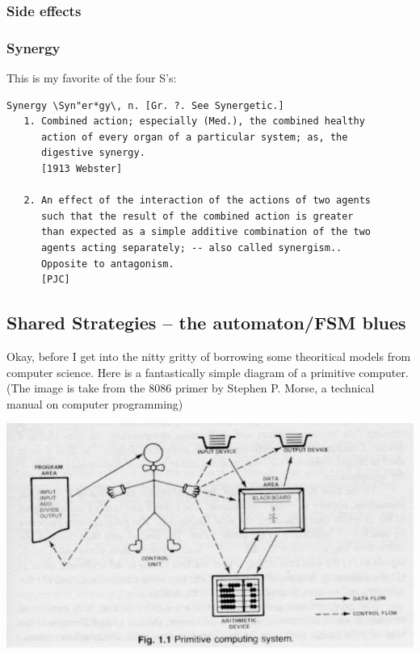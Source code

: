 \documentclass[11pt]{article}
\begin{document}
\subsubsection{Side effects}
\label{sec:orge5cecc2}


\subsubsection{Synergy}
\label{sec:org12de085}
This is my favorite of the four S's:

\begin{verbatim}
Synergy \Syn"er*gy\, n. [Gr. ?. See Synergetic.]
   1. Combined action; especially (Med.), the combined healthy
      action of every organ of a particular system; as, the
      digestive synergy.
      [1913 Webster]

   2. An effect of the interaction of the actions of two agents
      such that the result of the combined action is greater
      than expected as a simple additive combination of the two
      agents acting separately; -- also called synergism..
      Opposite to antagonism.
      [PJC]
\end{verbatim}


\subsection{Shared Strategies – the automaton/FSM blues}
\label{sec:org0582755}

Okay, before I get into the nitty gritty of borrowing some theoritical models 
from computer science. Here is a fantastically simple diagram of a primitive 
computer. (The image is take from the 8086 primer by Stephen P. Morse, a technical
manual on computer programming)

\begin{center}
\includegraphics[width=.9\linewidth]{../img/primitiveComputer.png}
\end{center}
\end{document}
